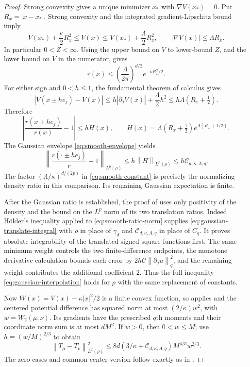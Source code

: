 \documentclass[11pt]{article}
\numberwithin{equation}{section}
\theoremstyle{remark}
\newcommand{\norm}[1]{\left\lVert #1\right\rVert}
\begin{document}
\begin{proof}
Strong convexity gives a unique minimizer $x_*$ with $\nabla V(x_*)=0$. Put $R_x=|x-x_*|$. Strong convexity and the integrated gradient-Lipschitz bound imply
\[
 V(x_*)+\frac\kappa2R_x^2\le V(x)
 \le V(x_*)+\frac\Lambda2R_x^2,
 \qquad |\nabla V(x)|\le\Lambda R_x.
\]
In particular $0<Z<\infty$. Using the upper bound on $V$ to lower-bound $Z$, and the lower bound on $V$ in the numerator, gives
\begin{equation}\label{eq:smooth-envelope}
 r(x)\le\left(\frac\Lambda{2\pi}\right)^{d/2}
                   e^{-\kappa R_x^2/2}.
\end{equation}
For either sign and $0<h\le1$, the fundamental theorem of calculus gives
\[
 |V(x\pm he_j)-V(x)|
 \le h|\partial_j V(x)|+\frac\Lambda2h^2
 \le h\Lambda(R_x+\tfrac12).
\]
Therefore
\[
 \left|\frac{r(x\pm he_j)}{r(x)}-1\right|
 \le hH(x),\qquad
 H(x)=\Lambda(R_x+\tfrac12)e^{\Lambda(R_x+1/2)}.
\]
The Gaussian envelope \eqref{eq:smooth-envelope} yields
\begin{equation}\label{eq:smooth-ratio-norm}
 \left\|\frac{r(\cdot\pm he_j)}r-1\right\|_{L^p(\rho)}
 \le h\norm H_{L^p(\rho)}
 \le h\mathcal C_{d,\kappa,\Lambda,q}.
\end{equation}
The factor $(\Lambda/\kappa)^{d/(2p)}$ in \eqref{eq:smooth-constant} is precisely the normalizing-density ratio in this comparison. Its remaining Gaussian expectation is finite.

After the Gaussian ratio is established, the proof of  uses only positivity of the density and the bound on the $L^p$ norm of its two translation ratios. Indeed H\"older's inequality applied to \eqref{eq:smooth-ratio-norm} supplies \eqref{eq:gaussian-translate-integral} with $\rho$ in place of $\gamma_d$ and $\mathcal C_{d,\kappa,\Lambda,q}$ in place of $C_q$. It proves absolute integrability of the translated signed-square functions first. The same minimum weight controls the two finite-difference endpoints, the monotone derivative calculation bounds each error by $2h\mathcal C\norm{\partial_j u}_q^2$, and the remaining weight contributes the additional coefficient $2$. Thus the full inequality \eqref{eq:gaussian-interpolation} holds for $\rho$ with the same replacement of constants.

Now $W(x)=V(x)-\kappa|x|^2/2$ is a finite convex function, so  applies and the centered potential difference has squared norm at most $(2/\kappa)w^2$, with $w=W_2(\mu,\nu)$. Its gradients have the prescribed $q$th moments and their coordinate norm sum is at most $dM^2$. If $w>0$, then $0<w\le M$; use $h=(w/M)^{2/3}$ to obtain
\[
 \norm{T_\mu-T_\nu}_{L^2(\rho)}^2
 \le 8d\left(3/\kappa+\mathcal C_{d,\kappa,\Lambda,q}\right)
                 M^{4/3}w^{2/3}.
\]
The zero cases and common-center version follow exactly as in .


\end{proof}
\end{document}
